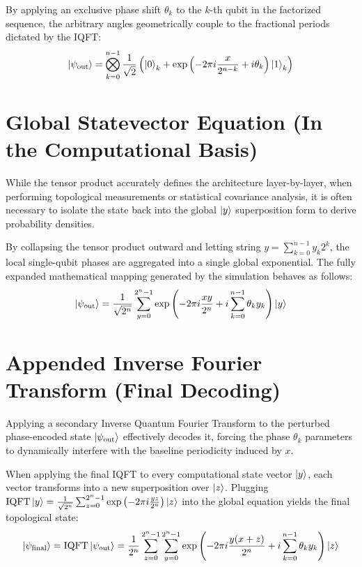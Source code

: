 \documentclass{article}
\begin{document}
By applying an exclusive phase shift $\theta_k$ to the $k$-th qubit in the factorized sequence, the arbitrary angles geometrically couple to the fractional periods dictated by the IQFT:
\begin{equation}
    \ket{\psi_{\text{out}}} = \bigotimes_{k=0}^{n-1} \frac{1}{\sqrt{2}} \left( \ket{0}_k + \exp\left(-2\pi i \frac{x}{2^{n-k}} + i\theta_k\right) \ket{1}_k \right)
\end{equation}

\section{Global Statevector Equation (In the Computational Basis)}
While the tensor product accurately defines the architecture layer-by-layer, when performing topological measurements or statistical covariance analysis, it is often necessary to isolate the state back into the global $\ket{y}$ superposition form to derive probability densities.

By collapsing the tensor product outward and letting string $y = \sum_{k=0}^{n-1} y_k 2^k$, the local single-qubit phases are aggregated into a single global exponential. The fully expanded mathematical mapping generated by the simulation behaves as follows:
\begin{equation}
    \ket{\psi_{\text{out}}} = \frac{1}{\sqrt{2^n}} \sum_{y=0}^{2^n-1} \exp\left(-2\pi i \frac{xy}{2^n} + i \sum_{k=0}^{n-1} \theta_k y_k \right) \ket{y}
\end{equation}

\section{Appended Inverse Fourier Transform (Final Decoding)}
Applying a secondary Inverse Quantum Fourier Transform to the perturbed phase-encoded state $\ket{\psi_{\text{out}}}$ effectively decodes it, forcing the phase $\theta_k$ parameters to dynamically interfere with the baseline periodicity induced by $x$. 

When applying the final IQFT to every computational state vector $\ket{y}$, each vector transforms into a new superposition over $\ket{z}$. Plugging $\text{IQFT}\ket{y} = \frac{1}{\sqrt{2^n}} \sum_{z=0}^{2^n-1} \exp\left(-2\pi i \frac{yz}{2^n}\right)\ket{z}$ into the global equation yields the final topological state:
\begin{equation}
    \ket{\psi_{\text{final}}} = \text{IQFT} \ket{\psi_{\text{out}}} = \frac{1}{2^n} \sum_{z=0}^{2^n-1} \sum_{y=0}^{2^n-1} \exp\left(-2\pi i \frac{y(x + z)}{2^n} + i \sum_{k=0}^{n-1} \theta_k y_k \right) \ket{z}
\end{equation}
\end{document}
